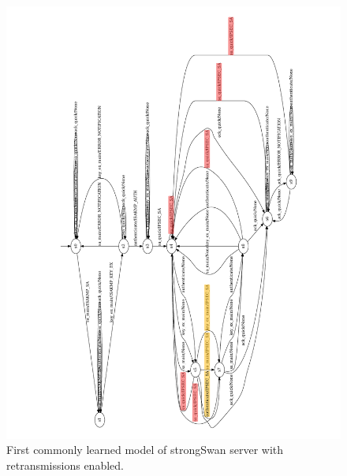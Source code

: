 \begin{figure}[H]
	\includegraphics[width=1.1\linewidth]{images/models/retransmissions/retrans_case1_lstar}
	\caption{First commonly learned model of strongSwan server with retransmissions enabled.}
	\label{fig:ret_case1}
\end{figure}

